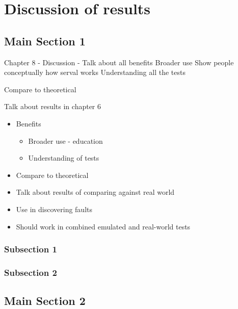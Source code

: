 
\chapter{Discussion of results} %

\label{Chapter8} %


\section{Main Section 1}
Chapter 8
- Discussion
- Talk about all benefits
Broader use
Show people conceptually how serval works
Understanding all the tests

Compare to theoretical

Talk about results in chapter 6

\begin{itemize}
    \item Benefits
    \begin{itemize}
        \item Broader use - education
        \item Understanding of tests
    \end{itemize}
    \item Compare to theoretical
    \item Talk about results of comparing against real world
    \item Use in discovering faults
    \item Should work in combined emulated and real-world tests
\end{itemize}




\subsection{Subsection 1}



\subsection{Subsection 2}


\section{Main Section 2}

